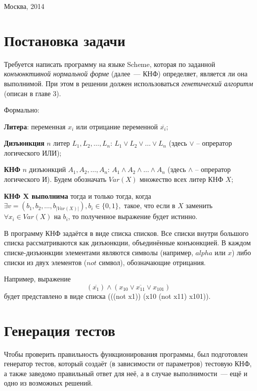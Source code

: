 \documentclass[12pt]{article}
\begin{document}
\vfill

\begin{center}
Москва, 2014
\end{center}

\pagebreak
\tableofcontents
\pagebreak

\newtheorem{definition} {Определение}
\newtheorem{option} {Свойство}
\newtheorem{theorem} {Теорема}


\section{Постановка задачи}
    Требуется написать программу на языке Scheme, которая по заданной  \textit{конъюнктивной нормальной форме} (далее~--- КНФ) определяет, является ли она выполнимой.
    При этом в решении должен использоваться \textit{генетический алгоритм} (описан в главе 3).

    Формально:

    \textbf{Литера}: переменная $x_i$ или отрицание переменной $\overline{x_i}$;

    \textbf{Дизъюнкция} $n$ литер $L_1, L_2, \ldots, L_n$: \space $L_1 \lor L_2 \lor \ldots \lor L_n$ (здесь $\lor$ -- опрератор логического ИЛИ);

    \textbf{КНФ} $n$ дизъюнкций $A_1, A_2, \ldots, A_n$: \space $A_1 \land A_2 \land \ldots \land A_n$ (здесь $\land$ -- опрератор логического И). Будем обозначать $Var(X)$ 
    множество всех литер КНФ $X$;

    \textbf{КНФ X выполнима} тогда и только тогда, когда $\exists v = (b_1, b_2, \ldots, b_{|Var(X)|}), b_i \in \{0, 1\},$ такое, что если в $X$ заменить $\forall x_i \in Var(X)$ на $b_i$, то полученное
    выражение будет истинно.

    В программу КНФ задаётся в виде списка списков. Все списки внутри большого списка рассматриваются как дизъюнкции, объединённые конъюнкцией. 
    В каждом списке-дизъюнкции элементами являются символы (например, $alpha$ или $x$) либо списки из двух элементов ($not$ символ), обозначающие отрицания.

    Например, выражение
    $$ (\overline{x_1}) \land (x_{10} \lor \overline{x_{11}} \lor x_{101}) $$
    будет представлено в виде списка (((not x1)) (x10 (not x11) x101)).

\pagebreak
\section{Генерация тестов}
    Чтобы проверить правильность функционирования программы, был подготовлен генератор тестов, который создаёт (в зависимости от параметров) тестовую КНФ, а также 
    заведомо правильный ответ для неё, а в случае выполнимости~--- ещё и одно из возможных решений.
\end{document}
